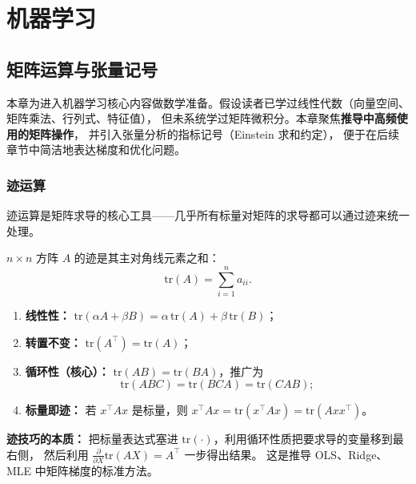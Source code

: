 \part{机器学习}

\chapter{矩阵运算与张量记号}

本章为进入机器学习核心内容做数学准备。假设读者已学过线性代数（向量空间、矩阵乘法、行列式、特征值），
但未系统学过矩阵微积分。本章聚焦\textbf{推导中高频使用的矩阵操作}，
并引入张量分析的指标记号（Einstein 求和约定），
便于在后续章节中简洁地表达梯度和优化问题。

\section{迹运算}

迹运算是矩阵求导的核心工具——几乎所有标量对矩阵的求导都可以通过迹来统一处理。

\begin{definition}[迹]
$n \times n$ 方阵 $A$ 的迹是其主对角线元素之和：
\begin{equation}
    \mathrm{tr}(A) = \sum_{i=1}^{n} a_{ii}.
\end{equation}
\end{definition}

\begin{proposition}[迹的基本性质]
\begin{enumerate}[label=(\arabic*)]
    \item \textbf{线性性：} $\mathrm{tr}(\alpha A + \beta B) = \alpha\,\mathrm{tr}(A) + \beta\,\mathrm{tr}(B)$；
    \item \textbf{转置不变：} $\mathrm{tr}(A^\top) = \mathrm{tr}(A)$；
    \item \textbf{循环性（核心）：} $\mathrm{tr}(AB) = \mathrm{tr}(BA)$，推广为
    \begin{equation}\label{eq:trace-cyclic}
        \mathrm{tr}(ABC) = \mathrm{tr}(BCA) = \mathrm{tr}(CAB);
    \end{equation}
    \item \textbf{标量即迹：} 若 $x^\top A x$ 是标量，则 $x^\top A x = \mathrm{tr}(x^\top A x) = \mathrm{tr}(A x x^\top)$。
\end{enumerate}
\end{proposition}

\textbf{迹技巧的本质：} 把标量表达式塞进 $\mathrm{tr}(\cdot)$，利用循环性质把要求导的变量移到最右侧，
然后利用 $\frac{\partial}{\partial X}\mathrm{tr}(AX) = A^\top$ 一步得出结果。
这是推导 OLS、Ridge、MLE 中矩阵梯度的标准方法。

